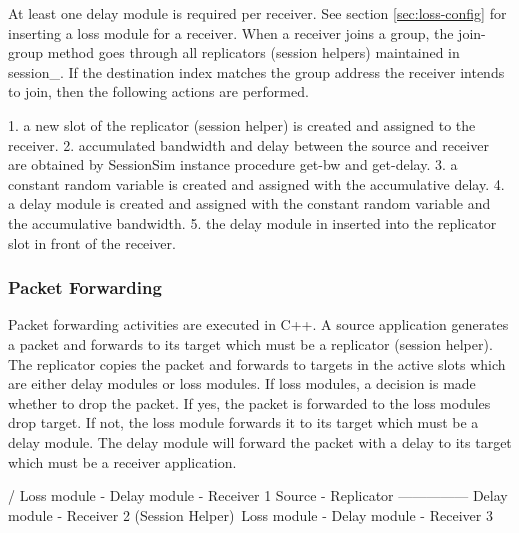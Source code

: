 \documentclass{article}
\begin{document}
At least one delay module is required per receiver. See section \ref{sec:loss-config} for inserting a loss module for a receiver.
When a receiver joins a group, the join-group{} method goes through
all replicators (session helpers) maintained in session_.  If the destination index matches the group address the receiver intends to join, 
then the following actions are performed.

1. a new slot of the replicator (session helper) is created and assigned to the receiver.
2. accumulated bandwidth and delay between the source and receiver are obtained by SessionSim instance procedure get-bw{} and get-delay{}.
3. a constant random variable is created and assigned with the
accumulative delay.
4. a delay module is created and assigned with the constant random 
variable and the accumulative bandwidth.
5. the delay module in inserted into the replicator slot in
front of the receiver.



\subsubsection{Packet Forwarding}
Packet forwarding activities are executed in C++.  A source application 
generates a packet and forwards to its target which must be a replicator 
(session helper).  The replicator copies the packet and forwards 
to targets in the active slots which are either delay modules or loss modules. If loss modules, a decision is made whether to drop the packet.
If yes, the packet is forwarded to the loss modules drop target.  If not,
the loss module forwards it to its target which must be a delay module.
The delay module will forward the packet with a delay to its target which
must be a receiver application.

\begin{program}
                    / Loss module - Delay module - Receiver 1
Source - Replicator --------------- Delay module - Receiver 2
    (Session Helper)\ Loss module - Delay module - Receiver 3

\end{program}
\end{document}
